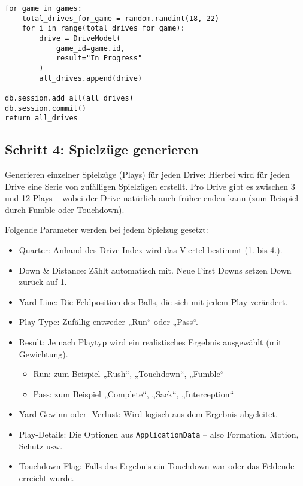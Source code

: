 \begin{verbatim}
for game in games:
    total_drives_for_game = random.randint(18, 22)
    for i in range(total_drives_for_game):
        drive = DriveModel(
            game_id=game.id,
            result="In Progress"
        )
        all_drives.append(drive)

db.session.add_all(all_drives)
db.session.commit()
return all_drives
\end{verbatim}

\subsection{Schritt 4: Spielzüge generieren}

Generieren einzelner Spielzüge (Plays) für jeden Drive: Hierbei wird für jeden Drive eine Serie von zufälligen Spielzügen erstellt. Pro Drive gibt es zwischen 3 und 12 Plays – wobei der Drive natürlich auch früher enden kann (zum Beispiel durch Fumble oder Touchdown).

Folgende Parameter werden bei jedem Spielzug gesetzt:
\begin{itemize}
  \item Quarter: Anhand des Drive-Index wird das Viertel bestimmt (1. bis 4.).
  \item Down \& Distance: Zählt automatisch mit. Neue First Downs setzen Down zurück auf 1.
  \item Yard Line: Die Feldposition des Balls, die sich mit jedem Play verändert.
  \item Play Type: Zufällig entweder „Run“ oder „Pass“.
  \item Result: Je nach Playtyp wird ein realistisches Ergebnis ausgewählt (mit Gewichtung).
  \begin{itemize}
    \item Run: zum Beispiel „Rush“, „Touchdown“, „Fumble“
    \item Pass: zum Beispiel „Complete“, „Sack“, „Interception“
  \end{itemize}
  \item Yard-Gewinn oder -Verlust: Wird logisch aus dem Ergebnis abgeleitet.
  \item Play-Details: Die Optionen aus \texttt{ApplicationData} – also Formation, Motion, Schutz usw.
  \item Touchdown-Flag: Falls das Ergebnis ein Touchdown war oder das Feldende erreicht wurde.
\end{itemize}

